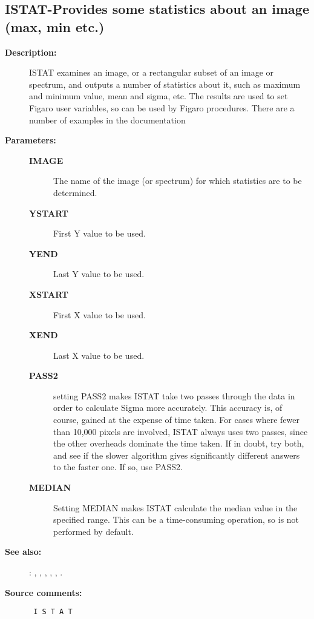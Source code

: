 \subsection{ISTAT-\label{ISTAT}Provides some statistics about an image (max, min etc.)}
\begin{description}

\item [{\bf Description:}]
 ISTAT examines an image, or a rectangular subset of an image or
 spectrum, and outputs a number of statistics about it, such as
 maximum and minimum value, mean and sigma, etc.  The results
 are used to set Figaro user variables, so can be used by Figaro
 procedures.  There are a number of examples in the documentation

\item [{\bf Parameters:}]
\begin{description}
\item [{\bf IMAGE}]
 The name of the image (or spectrum) for
 which statistics are to be determined.
\item [{\bf YSTART}]
 First Y value to be used.
\item [{\bf YEND}]
 Last Y value to be used.
\item [{\bf XSTART}]
 First X value to be used.
\item [{\bf XEND}]
 Last X value to be used.
\item [{\bf PASS2}]
 setting PASS2 makes ISTAT take two passes through the
 data in order to calculate Sigma more accurately.  This
 accuracy is, of course, gained at the expense of time
 taken.  For cases where fewer than 10,000 pixels are
 involved, ISTAT always uses two passes, since the other
 overheads dominate the time taken.  If in doubt, try
 both, and see if the slower algorithm gives significantly
 different answers to the faster one.  If so, use PASS2.
\item [{\bf MEDIAN}]
 Setting MEDIAN makes ISTAT calculate the median value
 in the specified range.  This can be a time-consuming
 operation, so is not performed by default.
\end{description}

\item [{\bf See also:}]
: , , , , , .\\

\item [{\bf Source comments:}]
\begin{verbatim}
 I S T A T


\end{verbatim}
\end{description}
